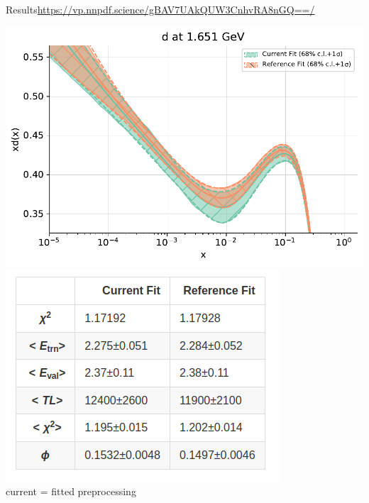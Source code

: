 \documentclass[aspectratio=169, 8pt,t]{beamer}
\begin{document}
\begin{frame}{Results}{\url{https://vp.nnpdf.science/gBAV7UAkQUW3CnhvRA8nGQ==/}}
  \begin{center}
    \includegraphics[height=0.5\textheight]{pdf_fittedpreproc.pdf}
    \includegraphics[height=0.5\textheight]{pdf_fittedpreproc_summary.png} \\
    current = fitted preprocessing
  \end{center}

\end{frame}
\end{document}
